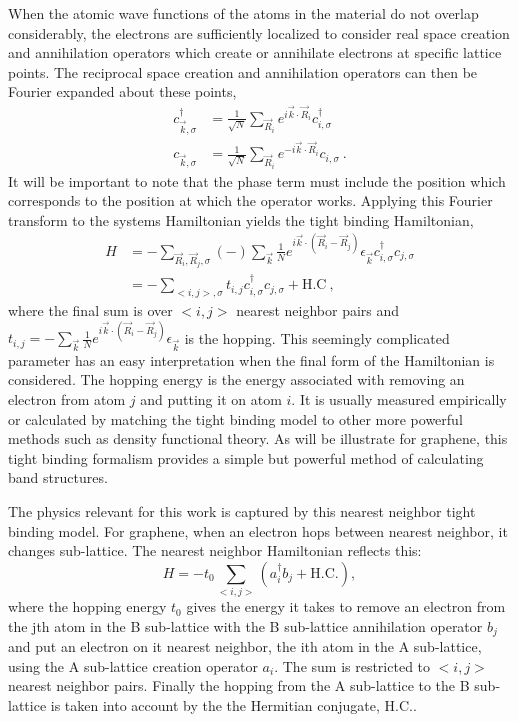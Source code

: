 When the atomic wave functions of the atoms in the material do not overlap considerably, the electrons are sufficiently localized to consider real space creation and annihilation operators which create or annihilate electrons at specific lattice points.
The reciprocal space creation and annihilation operators can then be Fourier expanded about these points,
\begin{align*}
	c^{\dagger}_{\vec{k},\sigma}&=\frac{1}{\sqrt{N}}\sum_{\vec{R}_i} e^{ i \vec{k} \cdot \vec{R}_i} c^{\dagger}_{i,\sigma} \\
	c          _{\vec{k},\sigma}&=\frac{1}{\sqrt{N}}\sum_{\vec{R}_i} e^{-i \vec{k} \cdot \vec{R}_i} c_{i,\sigma} \ .
\end{align*}
It will be important to note that the phase term must include the position which corresponds to the position at which the operator works.
Applying this Fourier transform to the systems Hamiltonian yields the tight binding Hamiltonian,
\begin{align*}
	H&=-\sum_{\vec{R}_i, \vec{R}_j,\sigma} (-) \sum_{\vec{k}}\frac{1}{N} e^{i \vec{k} \cdot (\vec{R}_i-\vec{R}_j)}
	 \epsilon_{\vec{k}} c^{\dagger}_{i,\sigma} c_{j,\sigma} \\
	 &=-\sum_{<i,j>,\sigma} t_{i,j} c^{\dagger}_{i,\sigma} c_{j,\sigma} + \text{H.C} \ ,
\end{align*}
where the final sum is over $<i,j>$ nearest neighbor pairs and $t_{i,j}=-\sum_{\vec{k}}\frac{1}{N} e^{i \vec{k} \cdot (\vec{R}_i-\vec{R}_j)}\epsilon_{\vec{k}}$ is the hopping.
This seemingly complicated parameter has an easy interpretation when the final form of the Hamiltonian is considered.
The hopping energy is the energy associated with removing an electron from atom $j$ and putting it on atom $i$.
It is usually measured empirically or calculated by matching the tight binding model to other more powerful methods such as density functional theory.
As will be illustrate for graphene, this tight binding formalism provides a simple but powerful method of calculating band structures.

The physics relevant for this work is captured by this nearest neighbor tight binding model.
For graphene, when an electron hops between nearest neighbor, it changes sub-lattice.
The nearest neighbor Hamiltonian reflects this:
\begin{equation}
	H=-t_0 \sum_{<i,j>} (a_i^{\dagger} b_j + \text{H.C.}),
	\label{eq:TB:baseham}
\end{equation}
where the hopping energy $t_0$ gives the energy it takes to remove an electron from the jth atom in the B sub-lattice with the B sub-lattice annihilation operator $b_j$ and put an electron on it nearest neighbor, the ith atom in the A sub-lattice, using the A sub-lattice creation operator $a_i$.
The sum is restricted to $<i,j>$ nearest neighbor pairs.
Finally the hopping from the A sub-lattice to the B sub-lattice is taken into account by the the Hermitian conjugate, $\text{H.C.}$.

